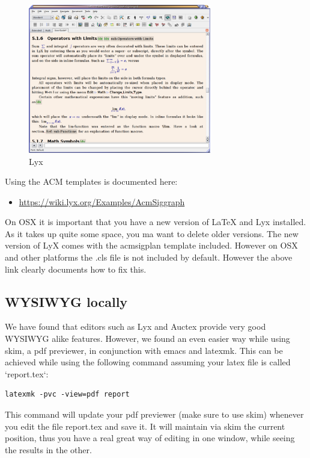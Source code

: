 \begin{figure}[!htb]
  \centering\includegraphics[width=8cm]{images/lyx.png}
  \caption{Lyx}
  \label{F:lyx}
\end{figure}

Using the ACM templates is documented here:

\begin{itemize}

\item
  \url{https://wiki.lyx.org/Examples/AcmSiggraph}
\end{itemize}

On OSX it is important that you have a new version of LaTeX and Lyx
installed. As it takes up quite some space, you ma want to delete older
versions. The new version of LyX comes with the acmsigplan template
included. However on OSX and other platforms the .cls file is not
included by default. However the above link clearly documents how to fix
this.

\subsection{WYSIWYG locally}\label{wysiwyg-locally}

We have found that editors such as Lyx and Auctex provide very good
WYSIWYG alike features. However, we found an even easier way while using
skim, a pdf previewer, in conjunction with emacs and latexmk. This can
be achieved while using the following command assuming your latex file
is called `report.tex`:

\begin{verbatim}
latexmk -pvc -view=pdf report
\end{verbatim}

This command will update your pdf previewer (make sure to use skim)
whenever you edit the file report.tex and save it. It will maintain via
skim the current position, thus you have a real great way of editing in
one window, while seeing the results in the other.

